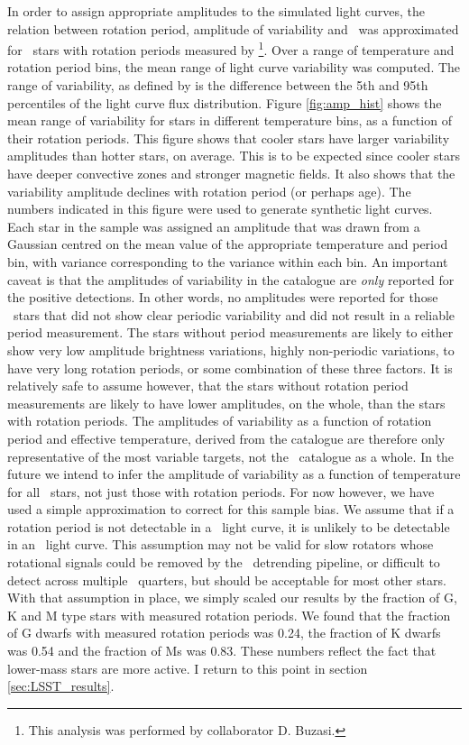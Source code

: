 In order to assign appropriate amplitudes to the simulated light curves,
the relation between rotation period, amplitude of variability
and \teff\ was approximated for \kepler\ stars with rotation periods
measured by \citet{Mcquillan2014}\footnote{This analysis was performed by
collaborator D. Buzasi.}.
Over a range of temperature and rotation period bins, the mean range of light
curve variability was computed.
The range of variability, as defined by \citet{Mcquillan2014} is the
difference between the 5th and 95th percentiles of the light curve flux
distribution.
Figure \ref{fig:amp_hist} shows the mean range of variability for stars in
different temperature bins, as a function of their rotation periods.
This figure shows that cooler stars have larger variability amplitudes than
hotter stars, on average.
This is to be expected since cooler stars have deeper convective zones and
stronger magnetic fields.
It also shows that the variability amplitude declines with rotation period
(or perhaps age).
The numbers indicated in this figure were used to generate synthetic light
curves.
Each star in the sample was assigned an amplitude that was drawn from a
Gaussian centred on the mean value of the appropriate temperature and period
bin, with variance corresponding to the variance within each bin.
An important caveat is that the amplitudes of variability in the
\citet{Mcquillan2014} catalogue are {\it only} reported for the positive
detections.
In other words, no amplitudes were reported for those \kepler\ stars that did
not show clear periodic variability and did not result in a reliable period
measurement.
The stars without period measurements are likely to either show very low
amplitude brightness variations, highly non-periodic variations, to have very
long rotation periods, or some combination of these three factors.
It is relatively safe to assume however, that the stars without rotation
period measurements are likely to have lower amplitudes, on the whole, than
the stars with rotation periods.
The amplitudes of variability as a function of rotation period and effective
temperature, derived from the \citet{Mcquillan2014} catalogue are therefore
only representative of the most variable targets, not the \kepler\ catalogue
as a whole.
In the future we intend to infer the amplitude of variability as a function of
temperature for all \kepler\ stars, not just those with rotation periods.
For now however, we have used a simple approximation to correct for this
sample bias.
We assume that if a rotation period is not detectable in a \kepler\ light
curve, it is unlikely to be detectable in an \LSST\ light curve.
This assumption may not be valid for slow rotators whose rotational signals
could be removed by the \kepler\ detrending pipeline, or difficult to detect
across multiple \kepler\ quarters, but should be acceptable for most other
stars.
With that assumption in place, we simply scaled our results by the fraction of
G, K and M type stars with measured rotation periods.
We found that the fraction of G dwarfs with measured rotation periods was
0.24, the fraction of K dwarfs was 0.54 and the fraction of Ms was 0.83.
These numbers reflect the fact that lower-mass stars are more active.
I return to this point in section \textsection\ref{sec:LSST_results}.


